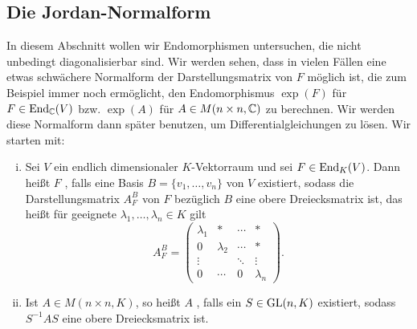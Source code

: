 \subsection{Die Jordan-Normalform}
\label{sec:2.9}

In diesem Abschnitt wollen wir Endomorphismen untersuchen, die nicht unbedingt diagonalisierbar sind.
Wir werden sehen, dass in vielen Fällen eine etwas schwächere Normalform der Darstellungsmatrix von $F$ möglich ist, die zum Beispiel immer noch ermöglicht, den Endomorphismus $\exp(F)$ für $F \in \operatorname{End}_{\mathbb{C}}(V)$ bzw. $\exp(A)$ für $A \in M(n \times n, \mathbb{C})$ zu berechnen.
Wir werden diese Normalform dann später benutzen, um Differentialgleichungen zu lösen.
Wir starten mit:

\begin{definition}[trigonalisierbar]
	\label{def:9.1}
	\begin{enumerate}[(i)]
		\item Sei $V$ ein endlich dimensionaler $K$-Vektorraum und sei $F \in \operatorname{End}_K(V)$.
		Dann heißt $F$ , falls eine Basis $B = \{v_1,\dots,v_n\}$ von $V$ existiert, sodass die Darstellungsmatrix $A_F^B$ von $F$ bezüglich $B$ eine obere Dreiecksmatrix ist, das heißt für geeignete $\lambda_1,\dots,\lambda_n \in K$ gilt
		\[
			A_F^B = \begin{pmatrix}
			\lambda_1 & * & \cdots & * \\ 
			0 & \lambda_2 & \cdots & * \\ 
			\vdots &  & \ddots & \vdots \\ 
			0 & \cdots & 0 & \lambda_n
			\end{pmatrix}. 
		\]
		\item Ist $A \in M(n \times n, K)$, so heißt $A$ , falls ein $S \in \operatorname{GL}(n,K)$ existiert, sodass $S^{-1}AS$ eine obere Dreiecksmatrix ist.
	\end{enumerate}
\end{definition}

